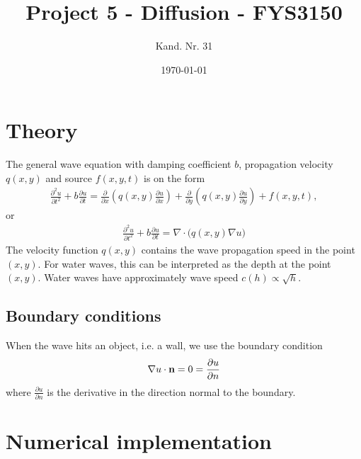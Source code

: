 \documentclass[a4paper,10pt]{article}
\title{Project 5 - Diffusion - FYS3150}
\date{\today}
\author{Kand. Nr. 31}
\renewcommand{\(}{\left(}
\renewcommand{\)}{\right)}
\newcommand{\dpart}[2]{\frac{\partial#1}{\partial#2}}
\begin{document}
\section*{Theory}
The general wave equation with damping coefficient $b$, propagation velocity $q(x,y)$ and source $f(x,y,t)$ is on the form
\begin{align}
\frac{\partial^2 u}{\partial t^2} + b\frac{\partial u}{\partial t} =
\frac{\partial}{\partial x}\left( q (x,y)
\frac{\partial u}{\partial x}\right) +
\frac{\partial}{\partial y}\left( q (x,y)
\frac{\partial u}{\partial y}\right) + f(x,y,t),
\end{align}
or
\begin{align}
\frac{\partial^2 u}{\partial t^2} + b\frac{\partial u}{\partial t} =
\nabla \cdot \big(q(x,y) \nabla u \big )
\end{align}
The velocity function $q(x,y)$ contains the wave propagation speed in the point $(x,y)$. For water waves, this can be interpreted as the depth at the point $(x,y)$. Water waves have approximately wave speed $c(h) \propto \sqrt h$.
\subsection*{Boundary conditions}
When the wave hits an object, i.e. a wall, we use the boundary condition
\begin{align*}
\nabla u\cdot \textbf n = 0 = \dpart{u}{n}
\end{align*}
where $\dpart{u}{n}$ is the derivative in the direction normal to the boundary. 
\section*{Numerical implementation}
\end{document}
